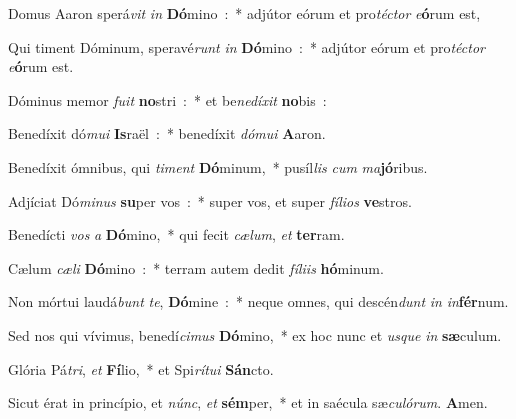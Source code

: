 \item Domus Aaron sperá\emph{vit} \emph{in} \textbf{Dó}mino~:~* adjútor eórum et pro\emph{té}\emph{ctor} \emph{e}\textbf{ó}rum est,
\item Qui timent Dóminum, speravé\emph{runt} \emph{in} \textbf{Dó}mino~:~* adjútor eórum et pro\emph{té}\emph{ctor} \emph{e}\textbf{ó}rum est.
\item Dóminus memor \emph{fu}\emph{it} \textbf{no}stri~:~* et be\emph{ne}\emph{dí}\emph{xit} \textbf{no}bis~:
\item Benedíxit dó\emph{mu}\emph{i} \textbf{Is}raël~:~* benedíxit \emph{dó}\emph{mu}\emph{i} \textbf{A}aron.
\item Benedíxit ómnibus, qui \emph{ti}\emph{ment} \textbf{Dó}minum,~* pu\-síl\-\emph{lis} \emph{cum} \emph{ma}\textbf{jó}ribus.
\item Adjíciat Dó\emph{mi}\emph{nus} \textbf{su}per vos~:~* super vos, et super \emph{fí}\-\emph{li}\-\emph{os} \textbf{ve}stros.
\item Benedícti \emph{vos} \emph{a} \textbf{Dó}mino,~* qui fecit \emph{cæ}\emph{lum}, \emph{et} \textbf{ter}\-ram.
\item Cælum \emph{cæ}\emph{li} \textbf{Dó}mino~:~* terram autem dedit \emph{fí}\emph{li}\emph{is} \textbf{hó}\-mi\-num.
\item Non mórtui laudá\emph{bunt} \emph{te}, \textbf{Dó}mine~:~* neque omnes, qui descén\emph{dunt} \emph{in} \emph{in}\textbf{fér}num.
\item Sed nos qui vívimus, benedí\emph{ci}\emph{mus} \textbf{Dó}mino,~* ex hoc nunc et \emph{us}\emph{que} \emph{in} \textbf{sæ}culum.
\item Glória Pá\emph{tri}, \emph{et} \textbf{Fí}lio,~* et Spi\emph{rí}\emph{tu}\emph{i} \textbf{Sán}cto.
\item Sicut érat in princípio, et \emph{núnc}, \emph{et} \textbf{sém}per,~* et in saécula sæ\emph{cu}\emph{ló}\emph{rum}. \textbf{A}men.
